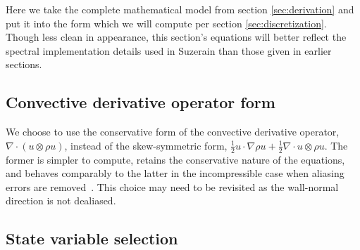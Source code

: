 \documentclass[letterpaper,11pt,nointlimits,reqno]{amsart}
\begin{document}
Here we take the complete mathematical model from section \ref{sec:derivation}
and put it into the form which we will compute per section
\ref{sec:discretization}.  Though less clean in appearance, this section's
equations will better reflect the spectral implementation details used in
Suzerain than those given in earlier sections.

\subsection{Convective derivative operator form}

We choose to use the conservative form of the convective derivative operator,
$\nabla\cdot\left(u\otimes{}\rho{}u\right)$, instead of the skew-symmetric
form, $\frac{1}{2}u\cdot\nabla{}\rho{}u +
\frac{1}{2}\nabla\cdot{}u\otimes{}\rho{}u$.  The former is simpler to compute,
retains the conservative nature of the equations, and behaves comparably to the
latter in the incompressible case when aliasing errors are
removed~\cite{Zang1991Rotation}.  This choice may need to be revisited as the
wall-normal direction is not dealiased.

\subsection{State variable selection}
\label{state_variable_selection}
\end{document}
